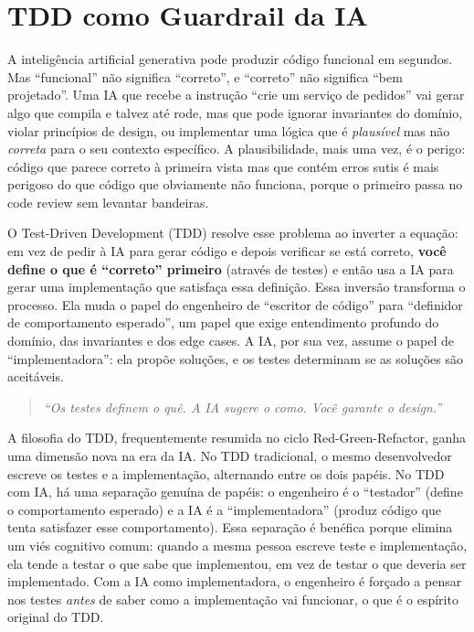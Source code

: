 \section{TDD como Guardrail da IA}

A inteligência artificial generativa pode produzir código funcional em segundos.
Mas ``funcional'' não significa ``correto'', e ``correto'' não significa ``bem
projetado''. Uma IA que recebe a instrução ``crie um serviço de pedidos'' vai
gerar algo que compila e talvez até rode, mas que pode ignorar invariantes
do domínio, violar princípios de design, ou implementar uma lógica que é
\emph{plausível} mas não \emph{correta} para o seu contexto específico. A
plausibilidade, mais uma vez, é o perigo: código que parece correto à primeira
vista mas que contém erros sutis é mais perigoso do que código que obviamente
não funciona, porque o primeiro passa no code review sem levantar bandeiras.

O Test-Driven Development (TDD) resolve esse problema ao inverter a equação:
em vez de pedir à IA para gerar código e depois verificar se está correto,
\textbf{você define o que é ``correto'' primeiro} (através de testes) e
então usa a IA para gerar uma implementação que satisfaça essa definição.
Essa inversão transforma o processo. Ela muda o papel do engenheiro
de ``escritor de código'' para ``definidor de comportamento esperado'', um
papel que exige entendimento profundo do domínio, das invariantes e dos
edge cases. A IA, por sua vez, assume o papel de ``implementadora'': ela
propõe soluções, e os testes determinam se as soluções são aceitáveis.

\begin{quote}
\textit{``Os testes definem o quê. A IA sugere o como. Você garante o design.''}
\end{quote}

A filosofia do TDD, frequentemente resumida no ciclo Red-Green-Refactor, ganha
uma dimensão nova na era da IA. No TDD tradicional, o mesmo desenvolvedor
escreve os testes e a implementação, alternando entre os dois papéis. No TDD com
IA, há uma separação genuína de papéis: o engenheiro é o ``testador'' (define o
comportamento esperado) e a IA é a ``implementadora'' (produz código que tenta
satisfazer esse comportamento). Essa separação é benéfica porque elimina um viés
cognitivo comum: quando a mesma pessoa escreve teste e implementação, ela tende
a testar o que sabe que implementou, em vez de testar o que deveria ser
implementado. Com a IA como implementadora, o engenheiro é forçado a pensar nos
testes \emph{antes} de saber como a implementação vai funcionar, o que é
o espírito original do TDD.

